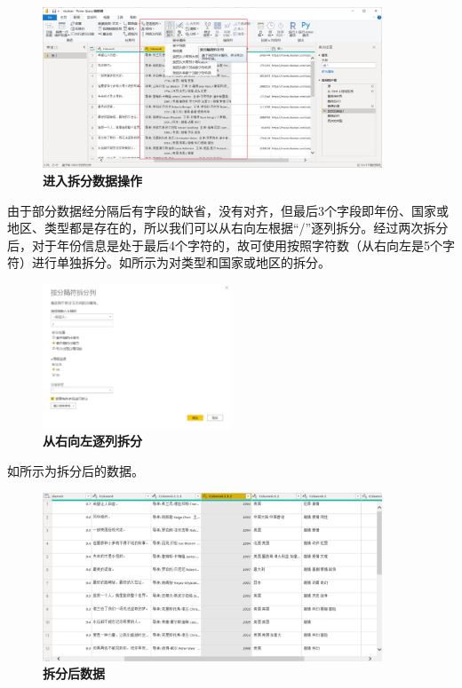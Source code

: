\begin{figure}[htbp]
    \centering
    \includegraphics[width=0.9\textwidth]{figure/PowerBI/douban_split_data.png}
    \caption{\textbf{进入拆分数据操作}}
    \label{fig:douban_split_data}
\end{figure}

由于部分数据经分隔后有字段的缺省，没有对齐，但最后3个字段即年份、国家或地区、类型都是存在的，所以我们可以从右向左根据``/''逐列拆分。经过两次拆分后，对于年份信息是处于最后4个字符的，故可使用按照字符数（从右向左是5个字符）进行单独拆分。如所示为对类型和国家或地区的拆分。

\begin{figure}[htbp]
    \centering
    \includegraphics[width=0.5\textwidth]{figure/PowerBI/douban_split_from_right.png}
    \caption{\textbf{从右向左逐列拆分}}
    \label{fig:douban_split_from_right}
\end{figure}

如所示为拆分后的数据。

\begin{figure}[htbp]
    \centering
    \includegraphics[width=0.9\textwidth]{figure/PowerBI/douban_split_data_after.png}
    \caption{\textbf{拆分后数据}}
    \label{fig:douban_split_data_after}
\end{figure}

